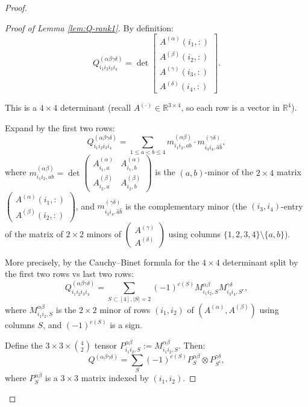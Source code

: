 \documentclass[12pt]{article}
\begin{document}
\begin{proof}
\begin{proof}[Proof of Lemma \ref{lem:Q-rank1}]
By definition:
\[
Q^{(\alpha\beta\gamma\delta)}_{i_1 i_2 i_3 i_4} = \det\begin{bmatrix} A^{(\alpha)}(i_1,:) \\ A^{(\beta)}(i_2,:) \\ A^{(\gamma)}(i_3,:) \\ A^{(\delta)}(i_4,:) \end{bmatrix}.
\]

This is a $4 \times 4$ determinant (recall $A^{(\cdot)} \in \mathbb{R}^{3 \times 4}$, so each row is a vector in $\mathbb{R}^4$).

Expand by the first two rows:
\[
Q^{(\alpha\beta\gamma\delta)}_{i_1 i_2 i_3 i_4} = \sum_{1 \leq a < b \leq 4} m^{(\alpha\beta)}_{i_1 i_2, ab} \cdot m^{(\gamma\delta)}_{i_3 i_4, \hat{a}\hat{b}},
\]
where $m^{(\alpha\beta)}_{i_1 i_2, ab} = \det\begin{pmatrix} A^{(\alpha)}_{i_1, a} & A^{(\alpha)}_{i_1, b} \\ A^{(\beta)}_{i_2, a} & A^{(\beta)}_{i_2, b} \end{pmatrix}$ is the $(a,b)$-minor of the $2\times 4$ matrix $\begin{pmatrix} A^{(\alpha)}(i_1,:) \\ A^{(\beta)}(i_2,:) \end{pmatrix}$, and $m^{(\gamma\delta)}_{i_3 i_4, \hat{a}\hat{b}}$ is the complementary minor (the $(i_3,i_4)$-entry of the matrix of $2\times 2$ minors of $\begin{pmatrix} A^{(\gamma)} \\ A^{(\delta)} \end{pmatrix}$ using columns $\{1,2,3,4\}\setminus\{a,b\}$).

More precisely, by the Cauchy--Binet formula for the $4\times 4$ determinant split by the first two rows vs last two rows:
\[
Q^{(\alpha\beta\gamma\delta)}_{i_1 i_2 i_3 i_4} = \sum_{S \subset [4], |S|=2} (-1)^{c(S)} M^{\alpha\beta}_{i_1 i_2, S} M^{\gamma\delta}_{i_3 i_4, S^c},
\]
where $M^{\alpha\beta}_{i_1 i_2, S}$ is the $2\times 2$ minor of rows $(i_1, i_2)$ of $(A^{(\alpha)}, A^{(\beta)})$ using columns $S$, and $(-1)^{c(S)}$ is a sign.

Define the $3\times 3\times \binom{4}{2}$ tensor $P^{\alpha\beta}_{i_1 i_2, S} := M^{\alpha\beta}_{i_1 i_2, S}$. Then:
\[
Q^{(\alpha\beta\gamma\delta)} = \sum_{S} (-1)^{c(S)} P^{\alpha\beta}_S \otimes P^{\gamma\delta}_{S^c},
\]
where $P^{\alpha\beta}_S$ is a $3\times 3$ matrix indexed by $(i_1, i_2)$.


\end{proof}
\end{proof}
\end{document}
